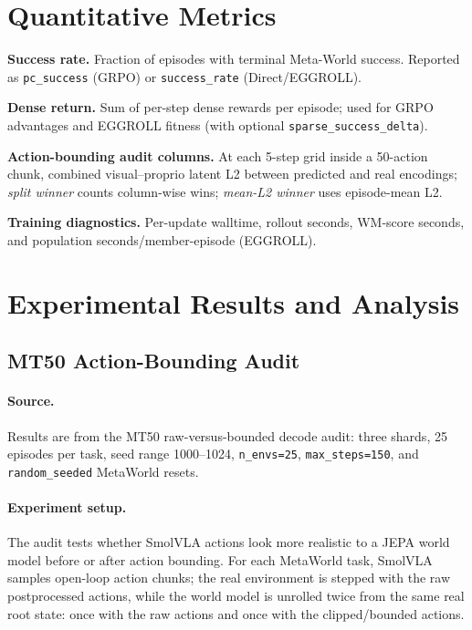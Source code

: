 \section{Quantitative Metrics}
\label{sec:quantitative-metrics}

\textbf{Success rate.} Fraction of episodes with terminal Meta-World success. Reported as \texttt{pc\_success} (GRPO) or \texttt{success\_rate} (Direct/EGGROLL).

\textbf{Dense return.} Sum of per-step dense rewards per episode; used for GRPO advantages and EGGROLL fitness (with optional \texttt{sparse\_success\_delta}).

\textbf{Action-bounding audit columns.} At each 5-step grid inside a 50-action chunk, combined visual--proprio latent L2 between predicted and real encodings; \emph{split winner} counts column-wise wins; \emph{mean-L2 winner} uses episode-mean L2.

\textbf{Training diagnostics.} Per-update walltime, rollout seconds, WM-score seconds, and population seconds/member-episode (EGGROLL).

\section{Experimental Results and Analysis}
\label{sec:experimental-results}

\subsection{MT50 Action-Bounding Audit}
\label{sec:action-bounding-audit}

\paragraph{Source.}
Results are from the MT50 raw-versus-bounded decode audit: three shards, 25 episodes per task, seed range 1000--1024, \texttt{n\_envs=25}, \texttt{max\_steps=150}, and \texttt{random\_seeded} MetaWorld resets.

\paragraph{Experiment setup.}
The audit tests whether SmolVLA actions look more realistic to a JEPA world model before or after action bounding. For each MetaWorld task, SmolVLA samples open-loop action chunks; the real environment is stepped with the raw postprocessed actions, while the world model is unrolled twice from the same real root state: once with the raw actions and once with the clipped/bounded actions.

